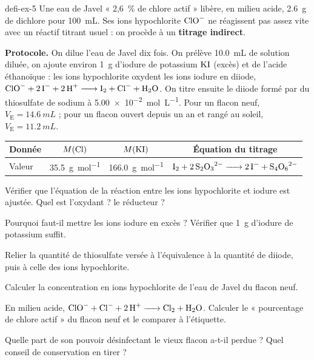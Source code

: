 \begin{blocEdition}{defi-ex-5}
Une eau de Javel « 2,6~\% de chlore actif » libère, en milieu acide, \qty{2,6}{g} de dichlore pour \qty{100}{mL}. Ses ions
hypochlorite $\ce{ClO-}$ ne réagissent pas assez vite avec un réactif titrant usuel : on procède à un \textbf{titrage indirect}.
\par\smallskip\noindent\textbf{Protocole.} On dilue l'eau de Javel dix fois. On prélève \qty{10,0}{mL} de solution diluée, on ajoute environ \qty{1}{g}
d'iodure de potassium $\ce{KI}$ (excès) et de l'acide éthanoïque : les ions hypochlorite oxydent les ions iodure en diiode,
$\ce{ClO- + 2I- + 2H+ -> I2 + Cl- + H2O}$. On titre ensuite le diiode formé par du thiosulfate de sodium à \qty{5,00e-2}{mol.L^{-1}}.
Pour un flacon neuf, $V_\mathrm{E}=\qty{14,6}{mL}$ ; pour un flacon ouvert depuis un an et rangé au soleil, $V_\mathrm{E}=\qty{11,2}{mL}$.
\begin{center}
\begin{tabular}{lccc}
\toprule
Donnée & $M(\ce{Cl})$ & $M(\ce{KI})$ & Équation du titrage \\
\midrule
Valeur & \qty{35,5}{g.mol^{-1}} & \qty{166,0}{g.mol^{-1}} & $\ce{I2 + 2S2O3^{2-} -> 2I- + S4O6^{2-}}$ \\
\bottomrule
\end{tabular}
\end{center}
\begin{questions}
\item Vérifier que l'équation de la réaction entre les ions hypochlorite et iodure est ajustée. Quel est l'oxydant ? le réducteur ?
\item Pourquoi faut-il mettre les ions iodure en excès ? Vérifier que \qty{1}{g} d'iodure de potassium suffit.
\item Relier la quantité de thiosulfate versée à l'équivalence à la quantité de diiode, puis à celle des ions hypochlorite.
\item Calculer la concentration en ions hypochlorite de l'eau de Javel du flacon neuf.
\item En milieu acide, $\ce{ClO- + Cl- + 2H+ -> Cl2 + H2O}$. Calculer le « pourcentage de chlore actif » du flacon neuf et le comparer à
l'étiquette.
\item Quelle part de son pouvoir désinfectant le vieux flacon a-t-il perdue ? Quel conseil de conservation en tirer ?
\end{questions}
\end{blocEdition}

